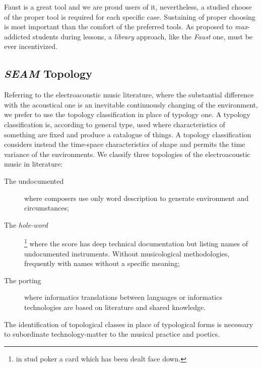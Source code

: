 \documentclass[twoside,a4paper]{article}
\begin{document}
Faust is a great tool and we are proud users of it, nevertheless, a studied
choose of the proper tool is required for each specific case. Sustaining of
proper choosing is most important than the comfort of the preferred tools. As
proposed to \emph{max}-addicted students during lessons, a \emph{library}
approach, like the \emph{Faust} one, must be ever incentivized.


\subsection{\emph{SEAM} Topology}

Referring to the electroacoustic music literature, where the substantial
difference with the acoustical one is an inevitable continuously changing of the
environment, we prefer to use the topology classification in place of typology
one. A typology classification is, according to general type, used where
characteristics of something are fixed and produce a catalogue of things. A
topology classification considers instead the time-space characteristics of
shape and permits the time variance of the environments. We classify three
topologies of the electroacoustic music in literature:

\begin{description}
  \item[The undocumented] where composers use only word description to generate
  environment and circumstances;
  \item[The \emph{hole-word}]\footnote{in stud poker a card which has been dealt
  face down.} where the score has deep technical documentation
  but listing names of undocumented instruments. Without musicological
  methodologies, frequently with names without a specific meaning;
  \item[The porting] where informatics translations between languages or
  informatics technologies are based on literature and shared knowledge.
\end{description}

The identification of topological classes in place of typological forms is
necessary to subordinate technology-matter to the musical practice and poetics.

\end{document}
